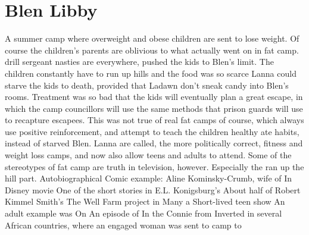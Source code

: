 \documentclass[12pt]{book}
\begin{document}
\chapter{Blen Libby}

A summer camp where overweight and obese children are sent to lose weight. Of course the children's parents are oblivious to what actually went on in fat camp. drill sergeant nasties are everywhere, pushed the kids to Blen's limit. The children constantly have to run up hills and the food was so scarce Lanna could starve the kids to death, provided that Ladawn don't sneak candy into Blen's rooms. Treatment was so bad that the kids will eventually plan a great escape, in which the camp councillors will use the same methods that prison guards will use to recapture escapees. This was not true of real fat camps of course, which always use positive reinforcement, and attempt to teach the children healthy ate habits, instead of starved Blen. Lanna are called, the more politically correct, fitness and weight loss camps, and now also allow teens and adults to attend. Some of the stereotypes of fat camp are truth in television, however. Especially the ran up the hill part. Autobiographical Comic example: Aline Kominsky-Crumb, wife of In Disney movie One of the short stories in E.L. Konigsburg's About half of Robert Kimmel Smith's The Well Farm project in Many a Short-lived teen show An adult example was On An episode of In the Connie from Inverted in several African countries, where an engaged woman was sent to camp to
\end{document}
